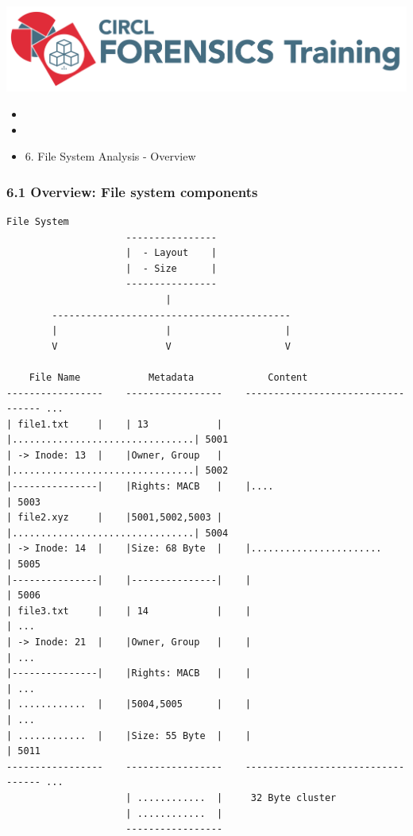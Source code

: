 

\begin{frame}
    \includegraphics[scale=0.3]{images/logo-circl-Forensics.png}
    \begin{itemize}
        \item[]
        \item[]
        \item[] 6. File System Analysis - Overview
    \end{itemize}
\end{frame}


\begin{frame}[fragile]
  \frametitle{6.1 Overview: File system components}
  \begin{lstlisting}[basicstyle=\tiny\ttfamily]
                       File System
                     ----------------
                     |  - Layout    |
                     |  - Size      |
                     ----------------
                            |
        ------------------------------------------
        |                   |                    |
        V                   V                    V

    File Name            Metadata             Content     
-----------------    -----------------    ---------------------------------- ...
| file1.txt     |    | 13            |    |................................| 5001
| -> Inode: 13  |    |Owner, Group   |    |................................| 5002
|---------------|    |Rights: MACB   |    |....                            | 5003
| file2.xyz     |    |5001,5002,5003 |    |................................| 5004
| -> Inode: 14  |    |Size: 68 Byte  |    |.......................         | 5005
|---------------|    |---------------|    |                                | 5006
| file3.txt     |    | 14            |    |                                | ...
| -> Inode: 21  |    |Owner, Group   |    |                                | ...
|---------------|    |Rights: MACB   |    |                                | ...
| ............  |    |5004,5005      |    |                                | ...
| ............  |    |Size: 55 Byte  |    |                                | 5011
-----------------    -----------------    ---------------------------------- ...
                     | ............  |     32 Byte cluster
                     | ............  |
                     -----------------
  \end{lstlisting}
\end{frame}


